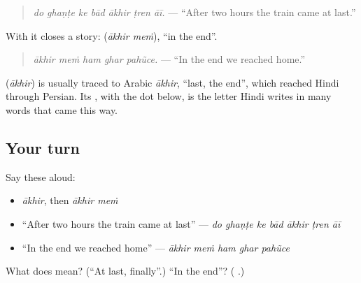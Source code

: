 \begin{quote}
\textbf{      }
\end{quote}

\begin{quote}
\emph{do ghaṇṭe ke bād ākhir ṭren āī.} — \textquotedblleft{}After two hours the train came at last.\textquotedblright{}
\end{quote}

With \textbf{} it closes a story: \textbf{ } (\emph{ākhir meṁ}), \textquotedblleft{}in the end\textquotedblright{}.

\begin{quote}
\textbf{    }
\end{quote}

\begin{quote}
\emph{ākhir meṁ ham ghar pahũce.} — \textquotedblleft{}In the end we reached home.\textquotedblright{}
\end{quote}

\begin{cousinweb}
\textbf{} (\emph{ākhir}) is usually traced to Arabic \emph{ākhir}, \textquotedblleft{}last, the end\textquotedblright{}, which reached Hindi through Persian. Its \textbf{}, with the dot below, is the letter Hindi writes in many words that came this way.
\end{cousinweb}

\subsection*{Your turn}
Say these aloud:

\begin{itemize}
\raggedright
  \item \emph{ākhir}, then \emph{ākhir meṁ}
  \item \textquotedblleft{}After two hours the train came at last\textquotedblright{} — \emph{do ghaṇṭe ke bād ākhir ṭren āī}
  \item \textquotedblleft{}In the end we reached home\textquotedblright{} — \emph{ākhir meṁ ham ghar pahũce}
\end{itemize}

\begin{tcolorbox}[breakable,colback=teal!4,colframe=teal!35!black,title={Before you move on}]
What does \textbf{} mean? (\textquotedblleft{}At last, finally\textquotedblright{}.) \textquotedblleft{}In the end\textquotedblright{}? (\textbf{ }.)
\end{tcolorbox}
